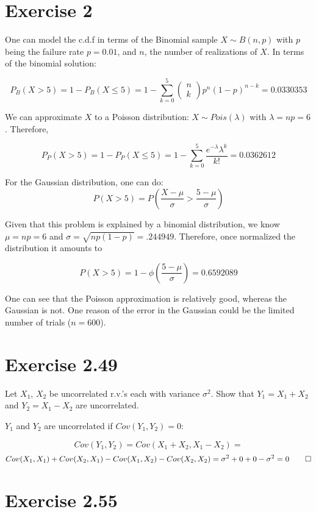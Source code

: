 \documentclass[10pt]{article}
\begin{document}
\section{Exercise 2}
  One can model the c.d.f in terms of the Binomial sample $X \sim B(n,p)$ with $p$ being the failure rate $p=0.01$, and $n$, the number
of realizations of $X$. In terms of the binomial solution:

\[
P_{B}(X > 5) = 1 - P_{B}(X \leq 5) = 1 - \sum_{k=0}^5 \begin{pmatrix} n \\ k \end{pmatrix} p^n (1-p)^{n-k} = 0.0330353 
\]

We can approximate $X$ to a Poisson distribution: $X \sim Pois(\lambda)$ with $\lambda=np = 6$. Therefore,

\[
P_{P}(X > 5) = 1- P_{P}(X \leq 5) = 1 -  \sum_{k=0}^5 \frac{ e^{-\lambda}\lambda^k}{k!} = 0.0362612 
\]

For the Gaussian distribution, one can do:
\[
 P (X > 5) = P\left( \frac{X -\mu}{\sigma} > \frac{5-\mu}{\sigma}     \right) 
\]

Given that this problem is explained by a binomial distribution, we know $\mu = np =6 $ and $\sigma = \sqrt{np(1-p)}=.244949$. Therefore,
once normalized the distribution it amounts to

\[
P (X >5) = 1 - \phi\left(\frac{5-\mu}{\sigma}\right) = 0.6592089
\]

One can see that the Poisson approximation is relatively good, whereas the Gaussian is not. One reason of the error in the Gaussian
could be the limited number of trials ($n=600$).

\section {Exercise 2.49} 

  Let $X_1$, $X_2$ be uncorrelated r.v.'s each with variance $\sigma^2$. Show that $Y_1 = X_1+X_2$ and $Y_2 =X_1 -X_2$ are 
  uncorrelated.

  $Y_1$ and $Y_2$ are uncorrelated if $Cov(Y_1,Y_2) =0$:

  \[
    Cov(Y_1,Y_2) = Cov(X_1 +X_2, X_1 -X_2) = 
  \]
  \[
Cov(X_1,X_1)+Cov(X_2,X_1) -Cov(X_1,X_2) -Cov(X_2,X_2) = \sigma^2 + 0 + 0 -\sigma^2 = 0 \qed
  \]


\section{Exercise 2.55}
\end{document}
